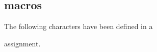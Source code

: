\subsection{\protect{} macros}

The following characters have been defined
in a
\begin{disp}\lb{}\rb
\end{disp}
assignment.
\par\leavevmode\par

